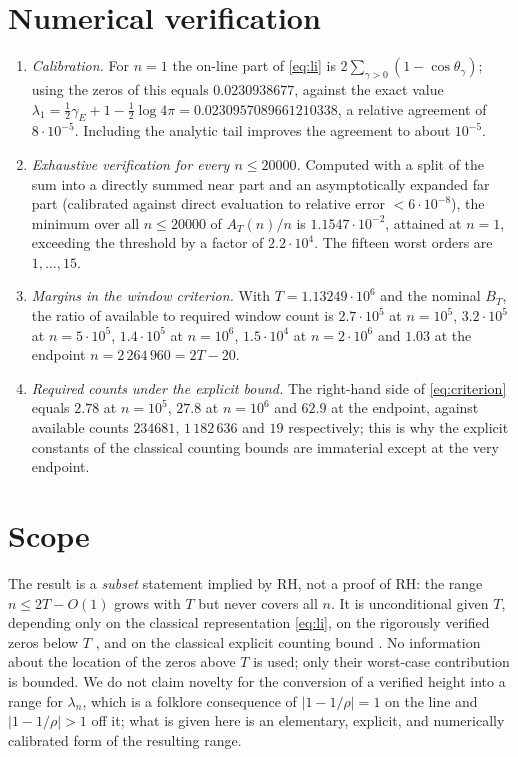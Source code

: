 \documentclass[11pt]{article}
\theoremstyle{remark}
\begin{document}
\section{Numerical verification}
\begin{enumerate}[label=(\roman*)]
\item \emph{Calibration.} For $n=1$ the on-line part of \eqref{eq:li} is
$2\sum_{\gamma>0}(1-\cos\theta_\gamma)$; using the zeros of \cite{Odlyzko} this equals
$0.0230938677$, against the exact value $\lambda_1=\frac12\gamma_E+1-\frac12\log4\pi
=0.0230957089661210338$, a relative agreement of $8\cdot10^{-5}$. Including the analytic tail
improves the agreement to about $10^{-5}$.
\item \emph{Exhaustive verification for every $n\le20000$.} Computed with a split of the sum into
a directly summed near part and an asymptotically expanded far part (calibrated against direct
evaluation to relative error $<6\cdot10^{-8}$), the minimum over all $n\le20000$ of
$A_T(n)/n$ is $1.1547\cdot10^{-2}$, attained at $n=1$, exceeding the threshold by a factor of
$2.2\cdot10^{4}$. The fifteen worst orders are $1,\dots,15$.
\item \emph{Margins in the window criterion.} With $T=1.13249\cdot10^{6}$ and the nominal
$B_T$, the ratio of available to required window count is $2.7\cdot10^{5}$ at $n=10^{5}$,
$3.2\cdot10^{5}$ at $n=5\cdot10^{5}$, $1.4\cdot10^{5}$ at $n=10^{6}$, $1.5\cdot10^{4}$ at
$n=2\cdot10^{6}$ and $1.03$ at the endpoint $n=2\,264\,960=2T-20$.
\item \emph{Required counts under the explicit bound.} The right-hand side of
\eqref{eq:criterion} equals $2.78$ at $n=10^{5}$, $27.8$ at $n=10^{6}$ and $62.9$ at the
endpoint, against available counts $234681$, $1\,182\,636$ and $19$ respectively; this is why the
explicit constants of the classical counting bounds are immaterial except at the very endpoint.
\end{enumerate}

\section{Scope}
\label{sec:scope}
The result is a \emph{subset} statement implied by RH, not a proof of RH: the range $n\le2T-O(1)$
grows with $T$ but never covers all $n$. It is unconditional given $T$, depending only on the
classical representation \eqref{eq:li}, on the rigorously verified zeros below $T$
\cite{PlattTrudgian}, and on the classical explicit counting bound \cite{Trudgian}. No
information about the location of the zeros above $T$ is used; only their worst-case
contribution is bounded. We do not claim novelty for the conversion of a verified height into a
range for $\lambda_n$, which is a folklore consequence of $|1-1/\rho|=1$ on the line and
$|1-1/\rho|>1$ off it; what is given here is an elementary, explicit, and numerically
calibrated form of the resulting range.
\end{document}
